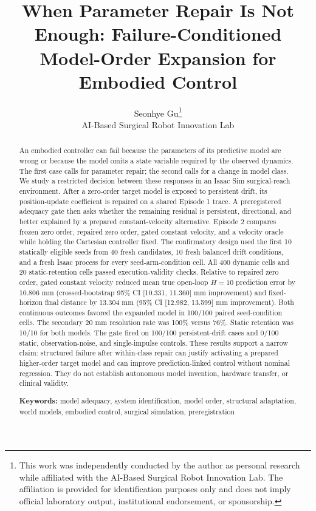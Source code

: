 \documentclass[10pt]{article}
\title{When Parameter Repair Is Not Enough: Failure-Conditioned Model-Order Expansion for Embodied Control}
\author{Seonhye Gu\thanks{This work was independently conducted by the author as personal research while affiliated with the AI-Based Surgical Robot Innovation Lab. The affiliation is provided for identification purposes only and does not imply official laboratory output, institutional endorsement, or sponsorship.}\\
\small AI-Based Surgical Robot Innovation Lab}
\date{}
\begin{document}
\maketitle


\begin{abstract}

An embodied controller can fail because the parameters of its predictive model are wrong or because the model omits a state variable required by the observed dynamics. The first case calls for parameter repair; the second calls for a change in model class. We study a restricted decision between these responses in an Isaac Sim surgical-reach environment. After a zero-order target model is exposed to persistent drift, its position-update coefficient is repaired on a shared Episode 1 trace. A preregistered adequacy gate then asks whether the remaining residual is persistent, directional, and better explained by a prepared constant-velocity alternative. Episode 2 compares frozen zero order, repaired zero order, gated constant velocity, and a velocity oracle while holding the Cartesian controller fixed. The confirmatory design used the first 10 statically eligible seeds from 40 fresh candidates, 10 fresh balanced drift conditions, and a fresh Isaac process for every seed-arm-condition cell. All 400 dynamic cells and 20 static-retention cells passed execution-validity checks. Relative to repaired zero order, gated constant velocity reduced mean true open-loop \(H=10\) prediction error by 10.806 mm (crossed-bootstrap 95\% CI [10.331, 11.360] mm improvement) and fixed-horizon final distance by 13.304 mm (95\% CI [12.982, 13.599] mm improvement). Both continuous outcomes favored the expanded model in 100/100 paired seed-condition cells. The secondary 20 mm resolution rate was 100\% versus 76\%. Static retention was 10/10 for both models. The gate fired on 100/100 persistent-drift cases and 0/100 static, observation-noise, and single-impulse controls. These results support a narrow claim: structured failure after within-class repair can justify activating a prepared higher-order target model and can improve prediction-linked control without nominal regression. They do not establish autonomous model invention, hardware transfer, or clinical validity.

\textbf{Keywords:} model adequacy, system identification, model order, structural adaptation, world models, embodied control, surgical simulation, preregistration

\end{abstract}
\end{document}
